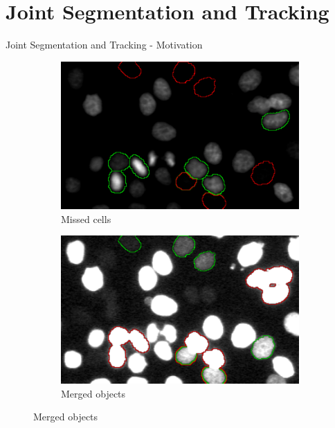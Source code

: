 \section{Joint Segmentation and Tracking}

\begin{frame}{Joint Segmentation and Tracking - Motivation}
    \begin{figure}
        \centering
        \begin{subfigure}[t]{0.48\textwidth}
            \includegraphics[width=\textwidth]{images/joint/mitocheck_255_max.pdf}
            \caption{Missed cells}
            \label{fig:joint-underseg-no-detection}
        \end{subfigure}
        \hfill
        \begin{subfigure}[t]{0.48\textwidth}
            \includegraphics[width=\textwidth]{images/joint/mitocheck_030_max.pdf}
            \caption{Merged objects}
            \label{fig:joint-underseg-mergers}
        \end{subfigure}
    \end{figure}

\end{frame}


